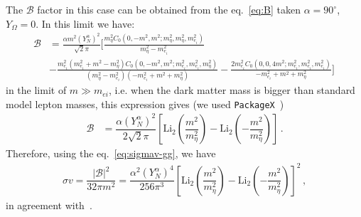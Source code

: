 \documentclass[12pt,letterpaper]{article}
\begin{document}
The $\mathcal{B}$ factor in this case can be obtained from the eq.~\ref{eq:B} taken $\alpha =90^{\circ}$, $Y_{\Omega}=0$. In this limit we have:
%
\begin{align}
\mathcal{B} &=
\frac{\alpha  m^2 (Y_N^{\alpha })^2}{\sqrt{2} \pi }\bigg[
\frac{m_{\eta }^2 C_0\left(0,-m^2,m^2;m_{\eta }^2,m_{\eta }^2,m_{e_i}^2\right)}{m_{\eta }^2-m_{e_i}^2}\nonumber\\
&-\frac{m_{e_i}^2 \left(m_{e_i}^2+m^2-m_{\eta }^2\right) C_0\left(0,-m^2,m^2;m_{e_i}^2,m_{e_i}^2,m_{\eta
   }^2\right)}{\left(m_{\eta }^2-m_{e_i}^2\right) \left(-m_{e_i}^2+m^2+m_{\eta }^2\right)}-\frac{2 m_{e_i}^2 C_0\left(0,0,4 m^2;m_{e_i}^2,m_{e_i}^2,m_{e_i}^2\right)}{-m_{e_i}^2+m^2+m_{\eta }^2}\bigg]\,
\end{align}
in the limit of $m\gg m_{ei}$, i.e. when the dark matter mass is bigger than  standard model lepton masses, this expression gives (we used \texttt{PackageX}~\cite{Patel:2015tea})
%
\begin{align}
\mathcal{B} &=
\dfrac{\alpha(Y_N^{\alpha })^2}{2\sqrt{2}\pi}
\left[\text{Li}_2\left(\dfrac{m^2}{m_{\eta}^2}\right)-\text{Li}_2\left(-\dfrac{m^2}{m_{\eta}^2}\right)\right]\,.
\end{align}
Therefore, using the eq.~\ref{eq:sigmav-gg}, we have
%
\begin{align}
\sigma v = \dfrac{|\mathcal{B}|^2}{32\pi m^2}=\dfrac{\alpha^2(Y_N^{\alpha })^4}{256\pi^3}\left[\text{Li}_2\left(\dfrac{m^2}{m_{\eta}^2}\right)-\text{Li}_2\left(-\dfrac{m^2}{m_{\eta}^2}\right)\right]^2\,,
\end{align}
in agreement with~\cite{Garny:2015wea}.
\end{document}
